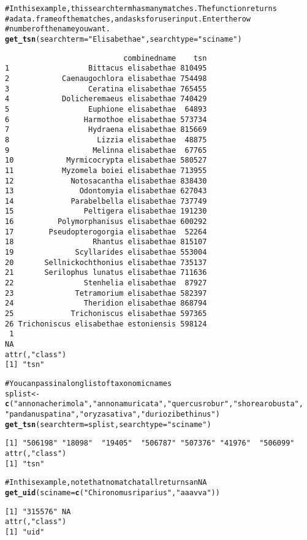 \documentclass[10pt]{article}\usepackage{graphicx, color}
\makeatletter
\newcommand{\hlfunctioncall}[1]{\textcolor[rgb]{0.501960784313725,0,0.329411764705882}{\textbf{#1}}}%
\newcommand{\hlstring}[1]{\textcolor[rgb]{0.6,0.6,1}{#1}}%
\newcommand{\hlcomment}[1]{\textcolor[rgb]{0.180392156862745,0.6,0.341176470588235}{#1}}%
\newenvironment{kframe}{%
 \def\at@end@of@kframe{}%
 \ifinner\ifhmode%
  \def\at@end@of@kframe{\end{minipage}}%
  \begin{minipage}{\columnwidth}%
 \fi\fi%
 \def\FrameCommand##1{\hskip\@totalleftmargin \hskip-\fboxsep
 \colorbox{shadecolor}{##1}\hskip-\fboxsep
     \hskip-\linewidth \hskip-\@totalleftmargin \hskip\columnwidth}%
 \MakeFramed {\advance\hsize-\width
   \@totalleftmargin\z@ \linewidth\hsize
   \@setminipage}}%
 {\par\unskip\endMakeFramed%
 \at@end@of@kframe}
\newenvironment{knitrout}{}{} %
\makeatother
\begin{document}
\begin{knitrout}
\color{fgcolor}\begin{kframe}
\begin{alltt}
\hlcomment{# In this example, this search term has many matches. The function returns}
\hlcomment{# a data.frame of the matches, and asks for user input. Enter the row}
\hlcomment{# number of the name you want.}
\hlfunctioncall{get_tsn}(searchterm = \hlstring{"Elisabethae"}, searchtype = \hlstring{"sciname"})
\end{alltt}
\begin{verbatim}
                           combinedname    tsn
1                  Bittacus elisabethae 810495
2            Caenaugochlora elisabethae 754498
3                  Ceratina elisabethae 765455
4            Dolicheremaeus elisabethae 740429
5                  Euphione elisabethae  64893
6                 Harmothoe elisabethae 573734
7                  Hydraena elisabethae 815669
8                    Lizzia elisabethae  48875
9                   Melinna elisabethae  67765
10            Myrmicocrypta elisabethae 580527
11           Myzomela boiei elisabethae 713955
12             Notosacantha elisabethae 838430
13               Odontomyia elisabethae 627043
14             Parabelbella elisabethae 737749
15                Peltigera elisabethae 191230
16          Polymorphanisus elisabethae 600292
17        Pseudopterogorgia elisabethae  52264
18                  Rhantus elisabethae 815107
19              Scyllarides elisabethae 553004
20       Sellnickochthonius elisabethae 735137
21       Serilophus lunatus elisabethae 711636
22                Stenhelia elisabethae  87927
23              Tetramorium elisabethae 582397
24                Theridion elisabethae 868794
25             Trichoniscus elisabethae 597365
26 Trichoniscus elisabethae estoniensis 598124
 1 
NA 
attr(,"class")
[1] "tsn"
\end{verbatim}
\begin{alltt}

\hlcomment{# You can pass in a long list of taxonomic names}
splist <- \hlfunctioncall{c}(\hlstring{"annona cherimola"}, \hlstring{"annona muricata"}, \hlstring{"quercus robur"}, \hlstring{"shorea robusta"}, 
    \hlstring{"pandanus patina"}, \hlstring{"oryza sativa"}, \hlstring{"durio zibethinus"})
\hlfunctioncall{get_tsn}(searchterm = splist, searchtype = \hlstring{"sciname"})
\end{alltt}
\begin{verbatim}
[1] "506198" "18098"  "19405"  "506787" "507376" "41976"  "506099"
attr(,"class")
[1] "tsn"
\end{verbatim}
\begin{alltt}

\hlcomment{# In this example, note that no match at all returns an NA}
\hlfunctioncall{get_uid}(sciname = \hlfunctioncall{c}(\hlstring{"Chironomus riparius"}, \hlstring{"aaa vva"}))
\end{alltt}
\begin{verbatim}
[1] "315576" NA      
attr(,"class")
[1] "uid"
\end{verbatim}
\end{kframe}
\end{knitrout}
\end{document}
